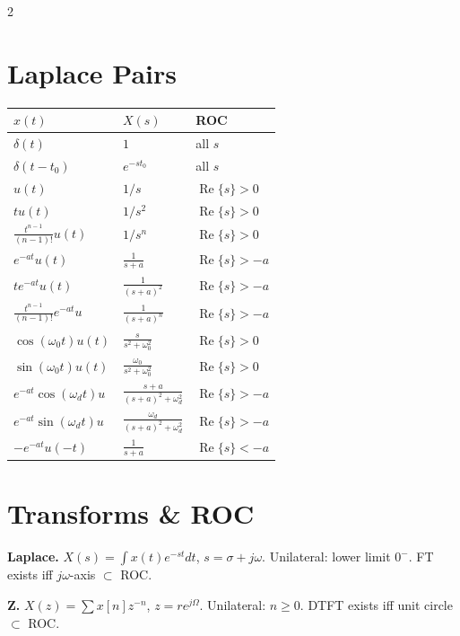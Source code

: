 \documentclass[11pt,landscape]{extarticle}
\renewcommand{\Re}{\operatorname{Re}}
\begin{document}
\begin{paracol}{2}

\section*{Laplace Pairs}
\begin{tabular}{@{}l l l@{}}
\toprule
$x(t)$ & $X(s)$ & ROC \\
\midrule
$\delta(t)$ & $1$ & all $s$ \\
$\delta(t{-}t_0)$ & $e^{-st_0}$ & all $s$ \\
$u(t)$ & $1/s$ & $\Re\{s\}{>}0$ \\
$tu(t)$ & $1/s^2$ & $\Re\{s\}{>}0$ \\
$\tfrac{t^{n-1}}{(n-1)!}u(t)$ & $1/s^n$ & $\Re\{s\}{>}0$ \\
$e^{-at}u(t)$ & $\tfrac{1}{s{+}a}$ & $\Re\{s\}{>}{-}a$ \\
$te^{-at}u(t)$ & $\tfrac{1}{(s{+}a)^2}$ & $\Re\{s\}{>}{-}a$ \\
$\tfrac{t^{n-1}}{(n-1)!}e^{-at}u$ & $\tfrac{1}{(s{+}a)^n}$ & $\Re\{s\}{>}{-}a$ \\
$\cos(\omega_0 t)u(t)$ & $\tfrac{s}{s^2{+}\omega_0^2}$ & $\Re\{s\}{>}0$ \\
$\sin(\omega_0 t)u(t)$ & $\tfrac{\omega_0}{s^2{+}\omega_0^2}$ & $\Re\{s\}{>}0$ \\
$e^{-at}\!\cos(\omega_d t)u$ & $\tfrac{s{+}a}{(s{+}a)^2{+}\omega_d^2}$ & $\Re\{s\}{>}{-}a$ \\
$e^{-at}\!\sin(\omega_d t)u$ & $\tfrac{\omega_d}{(s{+}a)^2{+}\omega_d^2}$ & $\Re\{s\}{>}{-}a$ \\
$-e^{-at}u(-t)$ & $\tfrac{1}{s{+}a}$ & $\Re\{s\}{<}{-}a$ \\
\bottomrule
\end{tabular}

\switchcolumn

\section*{Transforms \& ROC}
\textbf{Laplace.} $X(s)=\!\int x(t)e^{-st}dt$, $s=\sigma+j\omega$. Unilateral: lower limit $0^-$. FT exists iff $j\omega$-axis $\subset$ ROC.

\textbf{Z.} $X(z)=\!\sum x[n]z^{-n}$, $z=re^{j\Omega}$. Unilateral: $n\ge 0$. DTFT exists iff unit circle $\subset$ ROC.


\end{paracol}
\end{document}
